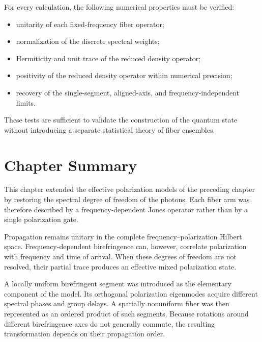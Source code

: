 For every calculation, the following numerical properties must be verified:

\begin{itemize}
    \item unitarity of each fixed-frequency fiber operator;
    \item normalization of the discrete spectral weights;
    \item Hermiticity and unit trace of the reduced density operator;
    \item positivity of the reduced density operator within numerical
    precision;
    \item recovery of the single-segment, aligned-axis, and
    frequency-independent limits.
\end{itemize}

These tests are sufficient to validate the construction of the quantum state
without introducing a separate statistical theory of fiber ensembles.


\section{Chapter Summary}
\label{sec:chapter_frequency_dependent_fiber_summary}

This chapter extended the effective polarization models of the preceding
chapter by restoring the spectral degree of freedom of the photons. Each
fiber arm was therefore described by a frequency-dependent Jones operator
rather than by a single polarization gate.

Propagation remains unitary in the complete
frequency--polarization Hilbert space. Frequency-dependent birefringence can,
however, correlate polarization with frequency and time of arrival. When
these degrees of freedom are not resolved, their partial trace produces an
effective mixed polarization state.

A locally uniform birefringent segment was introduced as the elementary
component of the model. Its orthogonal polarization eigenmodes acquire
different spectral phases and group delays. A spatially nonuniform fiber was
then represented as an ordered product of such segments. Because rotations
around different birefringence axes do not generally commute, the resulting
transformation depends on their propagation order.

